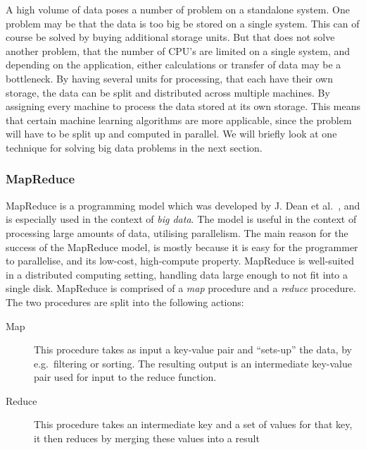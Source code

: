 A high volume of data poses a number of problem on a standalone system. One problem may be that the data is too big be stored on a single system.
This can of course be solved by buying additional storage units. But that does not solve another problem, that the number of CPU's are limited on a single system, and depending on the application, either calculations or transfer of data may be a bottleneck.
By having several units for processing, that each have their own storage, the data can be split and distributed across multiple machines. By assigning every machine to process the data stored at its own storage.
This means that certain machine learning algorithms are more applicable, since the problem will have to be split up and computed in parallel. We will briefly look at one technique for solving big data problems in the next section.

\subsubsection{MapReduce}\label{sec:mapreduce_programming_model}
MapReduce is a programming model which was developed by J. Dean et al.~\cite{DeanMapReduce}, and is especially used in the context of \emph{big data}. The model is useful in the context of processing large amounts of data, utilising parallelism. The main reason for the success of the MapReduce model, is mostly because it is easy for the programmer to parallelise, and its low-cost, high-compute property. MapReduce is well-suited in a distributed computing setting, handling data large enough to not fit into a single disk.
MapReduce is comprised of a \emph{map} procedure and a \emph{reduce} procedure. The two procedures are split into the following actions:

\begin{description}
    \item[Map] This procedure takes as input a key-value pair and ``sets-up'' the data, by e.g.\ filtering or sorting. The resulting output is an intermediate key-value pair used for input to the reduce function.
    \item[Reduce] This procedure takes an intermediate key and a set of values for that key, it then reduces by merging these values into a result
\end{description}









